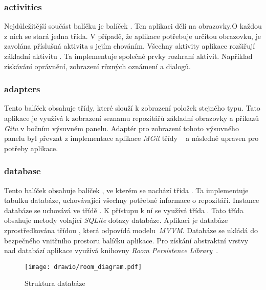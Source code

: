     \newpage
    \subsubsection{activities}
    Nejdůležitější součást balíčku  je balíček . Ten aplikaci dělí na obrazovky.O každou z nich se stará jedna třída. V případě, že aplikace potřebuje určitou obrazovku, je zavolána příslušná aktivita s jejím chováním. Všechny aktivity aplikace rozšiřují základní aktivitu . Ta implementuje společné prvky rozhraní aktivit. Například získávání oprávnění, zobrazení různých oznámení a dialogů.

    \subsubsection{adapters}
    Tento balíček obsahuje třídy, které slouží k zobrazení položek stejného typu. Tato aplikace je využívá k zobrazení seznamu repozitářů základní obrazovky a příkazů \emph{Gitu} v bočním výsuvném panelu. Adaptér  pro zobrazení tohoto výsuvného panelu byl převzat z implementace aplikace \emph{MGit} třídy ~ a následně upraven pro potřeby aplikace.

    \subsubsection{database}
    Tento balíček obsahuje balíček , ve kterém se nachází třída . Ta implementuje tabulku databáze, uchovávající všechny potřebné informace o repozitáři. Instance databáze se uchovává ve třídě . K přístupu k ní se využívá třída . Tato třída obsahuje metody volající \emph{SQLite} dotazy databáze. Aplikaci je databáze zprostředkována třídou , která odpovídá  modelu~\emph{MVVM}. Databáze se ukládá do bezpečného vnitřního prostoru balíčku aplikace. Pro získání abstraktní vrstvy nad databází aplikace využívá knihovny \emph{Room Persistence Library}~.

    \begin{figure}[h]
        \centering
        \vspace{0.5cm}
        \texttt{[image: drawio/room\_diagram.pdf]}
        \caption[Struktura databáze]{Struktura databáze~\cite{room-structure}}
        \label{diagram:packages}
    \end{figure}

